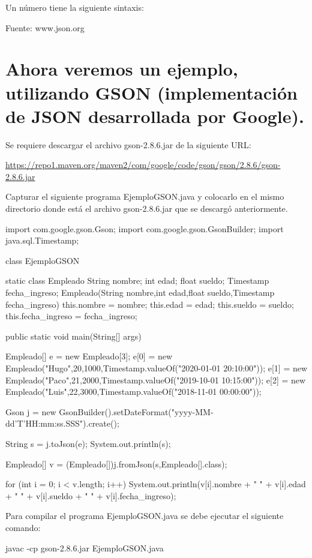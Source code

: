 \begin{SourceCode}
Un número tiene la siguiente sintaxis:

Fuente: www.json.org
\end{SourceCode}

\section{Ahora veremos un ejemplo, utilizando GSON (implementación de JSON desarrollada por Google).}

Se requiere descargar el archivo gson-2.8.6.jar de la siguiente URL:

\url{https://repo1.maven.org/maven2/com/google/code/gson/gson/2.8.6/gson-2.8.6.jar}

Capturar el siguiente programa EjemploGSON.java y colocarlo en el mismo directorio donde está el archivo gson-2.8.6.jar que se descargó anteriormente.

\begin{SourceCode}
import com.google.gson.Gson;
import com.google.gson.GsonBuilder;
import java.sql.Timestamp;

class EjemploGSON
{
  static class Empleado
  {
String nombre;
int edad;
float sueldo;
Timestamp fecha_ingreso;
Empleado(String nombre,int edad,float sueldo,Timestamp fecha_ingreso)
{
  this.nombre = nombre;
  this.edad = edad;
  this.sueldo = sueldo;
  this.fecha_ingreso = fecha_ingreso;
}
  }

  public static void main(String[] args)
  {
Empleado[] e = new Empleado[3];
e[0] = new Empleado("Hugo",20,1000,Timestamp.valueOf("2020-01-01 20:10:00"));
e[1] = new Empleado("Paco",21,2000,Timestamp.valueOf("2019-10-01 10:15:00"));
e[2] = new Empleado("Luis",22,3000,Timestamp.valueOf("2018-11-01 00:00:00"));

Gson j = new GsonBuilder().setDateFormat("yyyy-MM-dd'T'HH:mm:ss.SSS").create();

String s = j.toJson(e);
System.out.println(s);

Empleado[] v = (Empleado[])j.fromJson(s,Empleado[].class);

for (int i = 0; i < v.length; i++)
  System.out.println(v[i].nombre + " " + v[i].edad + " " + v[i].sueldo + " " + v[i].fecha_ingreso);
  }
}
\end{SourceCode}

Para compilar el programa EjemploGSON.java se debe ejecutar el siguiente comando:

\begin{SourceCode}
javac -cp gson-2.8.6.jar EjemploGSON.java
\end{SourceCode}

